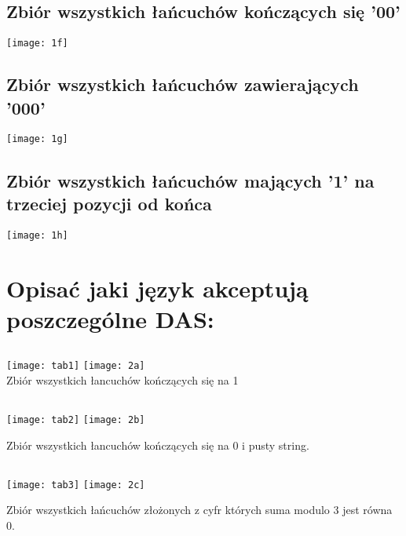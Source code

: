 \documentclass[a4paper,11pt]{article}
\begin{document}
\subsection{Zbiór wszystkich łańcuchów kończących się '00'}
\begin{center}
	\texttt{[image: 1f]}
\end{center}

\subsection{Zbiór wszystkich łańcuchów zawierających '000'}
\begin{center}
	\texttt{[image: 1g]}
\end{center}

\subsection{Zbiór wszystkich łańcuchów mających '1' na trzeciej pozycji od końca}
\begin{center}
	\texttt{[image: 1h]}
\end{center}

\newpage
\section{Opisać jaki język akceptują poszczególne DAS:}
\subsection{}
\begin{center}
  \texttt{[image: tab1]}
  \texttt{[image: 2a]} \\
  \huge
  Zbiór wszystkich łancuchów kończących się na 1
\end{center}
\subsection{}
\begin{center}
  \texttt{[image: tab2]}
  \texttt{[image: 2b]}
\end{center}
  \huge
  Zbiór wszystkich łancuchów kończących się na 0 i  pusty string.

\newpage
\subsection{}
\begin{center}
  \texttt{[image: tab3]}
  \texttt{[image: 2c]}
\end{center}
  \huge
  Zbiór wszystkich łańcuchów złożonych z cyfr których suma modulo 3 jest równa 0.
\end{document}
